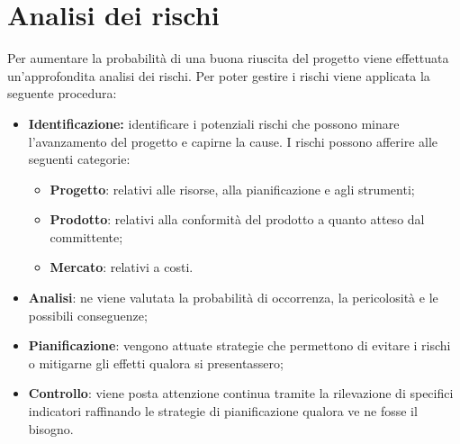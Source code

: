 \chapter{Analisi dei rischi}
Per aumentare la probabilità di una buona riuscita del progetto viene effettuata un'approfondita analisi dei rischi. Per poter gestire i rischi viene applicata la seguente procedura:
\begin{itemize}
	\item \textbf{Identificazione:} identificare i potenziali rischi che possono minare l'avanzamento del progetto e capirne la cause. I rischi possono afferire alle seguenti categorie:
	\begin{itemize}
		\item \textbf{Progetto}: relativi alle risorse, alla pianificazione e agli strumenti;
		\item \textbf{Prodotto}: relativi alla conformità del prodotto a quanto atteso dal committente;
		\item \textbf{Mercato}: relativi a costi.
	\end{itemize}
	\item \textbf{Analisi}: ne viene valutata la probabilità di occorrenza, la pericolosità e le possibili conseguenze;
	\item \textbf{Pianificazione}: vengono attuate strategie che permettono di evitare i rischi o mitigarne gli effetti qualora si presentassero;
	\item \textbf{Controllo}: viene posta attenzione continua tramite la rilevazione di specifici indicatori raffinando le strategie di pianificazione qualora ve ne fosse il bisogno.
\end{itemize}
